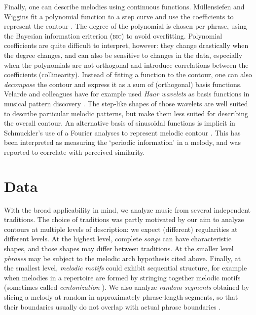 \documentclass{article}
\begin{document}
Finally, one can describe melodies using continuous functions.
Müllensiefen and Wiggins fit a polynomial function to a step curve and use the coefficients to represent the contour \cite{Mullensiefen2012}.
The degree of the polynomial is chosen per phrase, using the Bayesian information criterion (\textsc{bic}) to avoid overfitting.
Polynomial coefficients are quite difficult to interpret, however: they change drastically when the degree changes, and can also be sensitive to changes in the data, especially when the polynomials are not orthogonal and introduce correlations between the coefficients (collinearity).
Instead of fitting a function to the contour, one can also \emph{decompose} the contour and express it as a sum of (orthogonal) basis functions.
Velarde and colleagues have for example used \emph{Haar wavelets} as basis functions in musical pattern discovery \cite{Velarde2016}.
The step-like shapes of those wavelets are well suited to describe particular melodic patterns, but make them less suited for describing the overall contour.
An alternative basis of sinusoidal functions is implicit in Schmuckler's use of a Fourier analyses to represent melodic contour \cite{Schmuckler1999}.
This has been interpreted as measuring the `periodic information' in a melody, and was reported to correlate with perceived similarity.


\section{Data}


With the broad applicability in mind, we analyze music from several independent traditions.
The choice of traditions was partly motivated by our aim to analyze contours at multiple levels of description: we expect (different) regularities at different levels.
At the highest level, complete \emph{songs} can have characteristic shapes, and those shapes may differ between traditions. 
At the smaller level \emph{phrases} may be subject to the melodic arch hypothesis cited above.
Finally, at the smallest level, \emph{melodic motifs} could exhibit sequential structure, for example when melodies in a repertoire are formed by stringing together melodic motifs (sometimes called \emph{centonization} \cite{Nuttall2019}).
We also analyze \emph{random segments} obtained by slicing a melody at random in approximately phrase-length segments, so that their boundaries usually do not overlap with actual phrase boundaries \cite{Cornelissen2020DLfM}.
\end{document}
